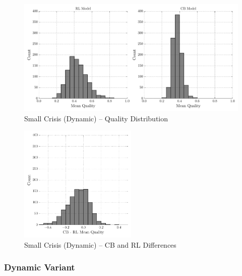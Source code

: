 \begin{figure}[h!]
	\includegraphics[width=\textwidth]{WarReason/Figures/SC_2_histograms}
    \caption{Small Crisis (Dynamic) -- Quality Distribution}
    \label{fig:sc2_outcomes}
    \figSpace
\end{figure}

\begin{figure}[h!]
	\includegraphics[width=0.5\textwidth]{WarReason/Figures/SC_2_deltas}
    \caption{Small Crisis (Dynamic) -- CB and RL Differences}
    \label{fig:sc2_deltas}
    \figSpace
\end{figure}

\subsubsection{Dynamic Variant}

